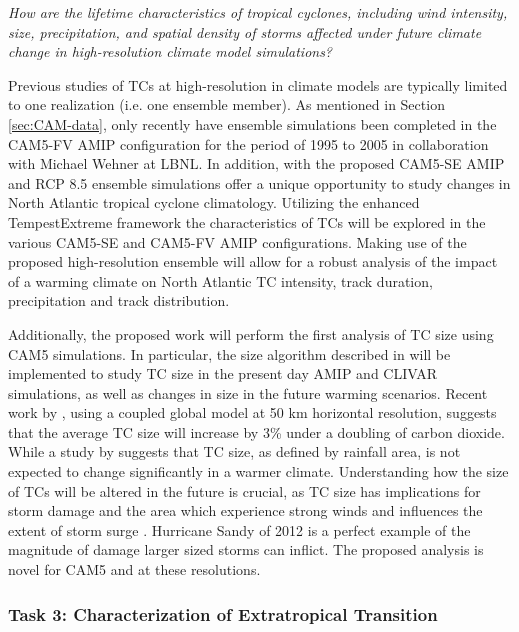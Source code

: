 \documentclass[11pt]{article}
\begin{document}
\emph{How are the lifetime characteristics of tropical cyclones, including wind intensity, size, precipitation, and spatial density of storms affected under future climate change in high-resolution climate model simulations?}

Previous studies of TCs at high-resolution in climate models are typically limited to one realization (i.e. one ensemble member). As mentioned in Section \ref{sec:CAM-data}, only recently have ensemble simulations been completed in the CAM5-FV AMIP configuration for the period of 1995 to 2005 in collaboration with Michael Wehner at LBNL. In addition, with the proposed CAM5-SE AMIP and RCP 8.5 ensemble simulations offer a unique opportunity to study changes in North Atlantic tropical cyclone climatology. Utilizing the enhanced TempestExtreme framework the characteristics of TCs will be explored in the various CAM5-SE and CAM5-FV AMIP configurations. Making use of the proposed high-resolution ensemble will allow for a robust analysis of the impact of a warming climate on North Atlantic TC intensity, track duration, precipitation and track distribution. 

Additionally, the proposed work will perform the first analysis of TC size using CAM5 simulations. In particular, the size algorithm described in \cite{Chavas2014} will be implemented to study TC size in the present day AMIP and CLIVAR simulations, as well as changes in size in the future warming scenarios. Recent work by \citet{Kim2014}, using a coupled global model at 50 km horizontal resolution, suggests that the average TC size will increase by 3\% under a doubling of carbon dioxide. While a study by \citet{Lin2015} suggests that TC size, as defined by rainfall area, is not expected to change significantly in a warmer climate. Understanding how the size of TCs will be altered in the future is crucial, as TC size has implications for storm damage and the area which experience strong winds and influences the extent of storm surge \citep{Powell2007}. Hurricane Sandy of 2012 is a perfect example of the magnitude of damage larger sized storms can inflict. The proposed analysis is novel for CAM5 and at these resolutions.
 
\subsubsection{Task 3: Characterization of Extratropical Transition}
\end{document}
